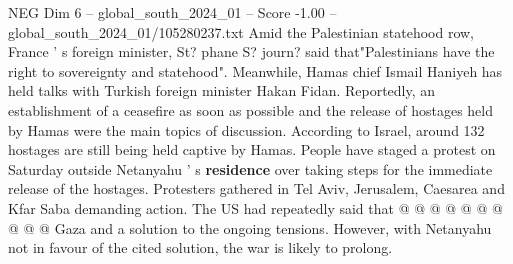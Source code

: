 \begin{textsample}{NEG Dim 6 – global\_south\_2024\_01 – Score -1.00 – global\_south\_2024\_01/105280237.txt}
Amid the Palestinian statehood row, France ' s foreign minister, St? phane S? journ? said that"Palestinians have the right to sovereignty and statehood".
Meanwhile, Hamas chief Ismail Haniyeh has held talks with Turkish foreign minister Hakan Fidan.
Reportedly, an establishment of a ceasefire as soon as possible and the release of hostages held by Hamas were the main topics of discussion.
According to Israel, around 132 hostages are still being held captive by Hamas.
People have staged a protest on Saturday outside Netanyahu ' s \textbf{residence} over taking steps for the immediate release of the hostages.
Protesters gathered in Tel Aviv, Jerusalem, Caesarea and Kfar Saba demanding action.
The US had repeatedly said that @ @ @ @ @ @ @ @ @ @ Gaza and a solution to the ongoing tensions.
However, with Netanyahu not in favour of the cited solution, the war is likely to prolong.

\end{textsample}

